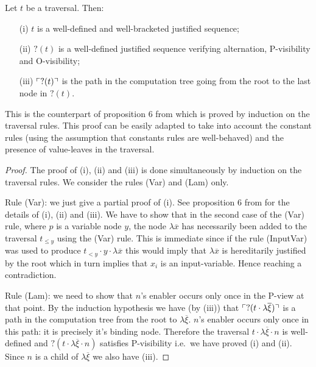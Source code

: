 \begin{prop}
\label{prop:pviewtrav_is_path}
Let $t$ be a traversal. Then:
\begin{itemize}
\item[(i)] $t$ is a well-defined and well-bracketed justified sequence;
\item[(ii)] $?(t)$ is a well-defined justified sequence verifying alternation, P-visibility and O-visibility;
\item[(iii)] $\ulcorner ?(t) \urcorner$ is the path in the computation tree going from the root to the last node in $?(t)$.
\end{itemize}
\end{prop}
This is the counterpart of proposition 6 from
\cite{OngHoMchecking2006} which is proved by induction on the
traversal rules. This proof can be easily adapted to take into
account the constant rules (using the assumption that constants
rules are well-behaved) and the presence of value-leaves in the
traversal.
\begin{proof}
The proof of (i), (ii) and (iii) is done simultaneously by induction on the traversal rules. We consider the rules (Var) and (Lam) only.

Rule (Var): we just give a partial proof of (i). See proposition 6 from \cite{OngHoMchecking2006} for the details of (i), (ii) and (iii). We have to show that in the second case of the (Var) rule, where $p$ is a variable node $y$, the node $\lambda \overline{x}$ has necessarily been added to the traversal $t_{\leq y}$ using the (Var) rule. This is immediate since if the rule (InputVar) was used to produce $t_{<y} \cdot y \cdot \lambda \overline{x}$ this would imply that $\lambda \overline{x}$ is hereditarily justified by the root which in turn implies that $x_i$ is an input-variable. Hence reaching a contradiction.

Rule (Lam): we need to show that $n$'s enabler occurs only once in the P-view at that point. By the induction hypothesis we have (by (iii)) that $\ulcorner ?(t \cdot \lambda \overline{\xi}) \urcorner$ is a path in the computation tree from the root to $\lambda \overline{\xi}$. $n$'s enabler occurs only once in this path: it is precisely it's binding node. Therefore the traversal $t \cdot \lambda \overline{\xi} \cdot n$ is well-defined and $?(t \cdot \lambda \overline{\xi} \cdot n)$ satisfies P-visibility i.e.\ we have proved (i) and (ii). Since $n$ is a child of $\lambda \overline{\xi}$ we also have (iii).
\end{proof}



